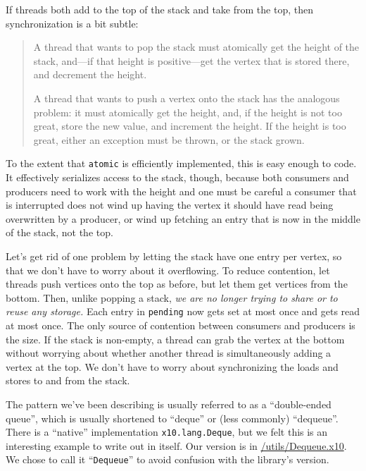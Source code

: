 If threads both add to the top of the stack and take from the top, then
synchronization is a bit subtle:
\begin{quote}
A thread that wants to pop the stack must atomically get the height of the
stack, and---if that height is positive---get the vertex that is stored there,
and decrement the height.

A thread that wants to push a vertex onto the stack has the analogous problem:
it must atomically get the height, and, if the height is not too great, store
the new value, and increment the height.  If the height is too great, either
an exception must be thrown, or the stack grown.
\end{quote}
To the extent that {\tt atomic} is efficiently implemented, this is easy enough
to code.  It effectively serializes access to the stack, though, because both
consumers and producers need to work with the height and one must be careful a
consumer that is interrupted does not wind up having the vertex it should have
read being overwritten by a producer, or wind up fetching an entry that is now
in the middle of the stack, not the top.

Let's get rid of one problem by letting the stack have one
entry per vertex, so that we don't have to worry about it overflowing.
To reduce contention, let threads push vertices onto the top as before, but
let them get vertices from the bottom.  Then, unlike popping a
stack, {\em we are no longer trying to share or to reuse any storage.}  Each
entry in {\tt pending} now gets set at most once and gets read at most once.
The only source of contention between consumers and producers is the size. If
the stack is non-empty, a thread can grab the vertex at the bottom without
worrying about whether another thread is simultaneously adding a vertex at the
top. We don't have to worry about synchronizing the loads and stores to and from
the stack.

The pattern we've been describing is usually referred to as a ``double-ended
queue'', which is usually shortened to ``deque'' or (less commonly) ``dequeue''.  
There is a ``native'' implementation {\tt x10.lang.Deque}, but we felt this is
an interesting example to write out in \Xten{} itself.  Our version is in
\href{http://dist.codehaus.org/x10/documentation/guide/src/utils/Dequeue.x10}{/utils/Dequeue.x10}.
We chose to call it ``{\tt Dequeue}'' to avoid confusion with the library's
version.

